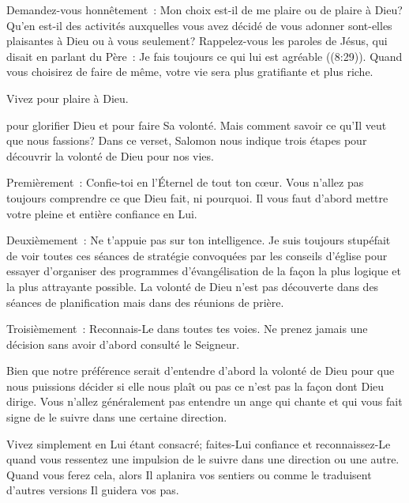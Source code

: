 Demandez-vous honnêtement~:
 Mon choix est-il de me plaire ou de plaire à Dieu?
 Qu'en est-il des activités auxquelles vous avez décidé de vous adonner
 \ocadr sont-elles plaisantes à Dieu ou à vous seulement?
 Rappelez-vous les paroles de Jésus, qui disait en parlant du Père~:
 \og Je fais toujours ce qui lui est agréable \fg{} ((8:29)).
 Quand vous choisirez de faire de même,
 votre vie sera plus gratifiante et plus riche. 

Vivez pour plaire à Dieu. 

\dvrule






 pour glorifier Dieu et pour faire Sa volonté.
 Mais comment savoir ce qu'Il veut que nous fassions?
 Dans ce verset, Salomon nous indique trois étapes pour découvrir
 la volonté de Dieu pour nos vies. 

Premièrement~: \og Confie-toi en l'Éternel de tout ton c\oe{}ur. \fg{}
 Vous n'allez pas toujours comprendre ce que Dieu fait, ni pourquoi.
 Il vous faut d'abord mettre votre pleine et entière confiance en Lui. 

Deuxièmement~: \og Ne t'appuie pas sur ton intelligence. \fg{}
 Je suis toujours stupéfait de voir toutes ces séances de stratégie
 convoquées par les conseils d'église pour essayer d'organiser
 des programmes d'évangélisation de la façon la plus logique
 et la plus attrayante possible.
 La volonté de Dieu n'est pas découverte dans des séances
 de planification mais dans des réunions de prière. 

Troisièmement~: \og Reconnais-Le dans toutes tes voies. \fg{}
 Ne prenez jamais une décision sans avoir d'abord consulté le Seigneur. 


Bien que notre préférence serait d'entendre d'abord la volonté de Dieu
 \ocadr pour que nous puissions décider si elle nous plaît ou pas \fg{}
 ce n'est pas la façon dont Dieu dirige.
 Vous n'allez généralement pas entendre un ange qui chante
 et qui vous fait signe de le suivre dans une certaine direction. 

Vivez simplement en Lui étant consacré; faites-Lui confiance
 et reconnaissez-Le quand vous ressentez une impulsion de le suivre
 dans une direction ou une autre.
 Quand vous ferez cela, alors \og Il aplanira vos sentiers \fg{}
 ou comme le traduisent d'autres versions \og Il guidera vos pas. \fg{}

\dvrule




